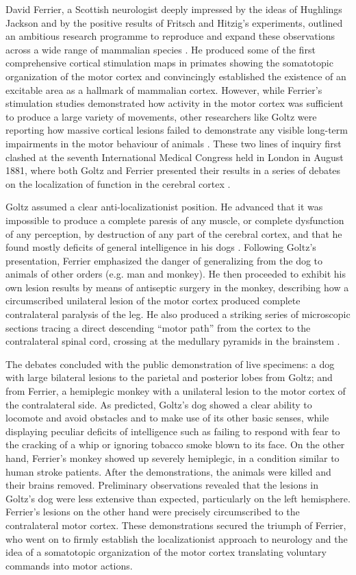 David Ferrier, a Scottish neurologist deeply impressed by the ideas of Hughlings Jackson and by the positive results of Fritsch and Hitzig's experiments, outlined an ambitious research programme to reproduce and expand these observations across a wide range of mammalian species \cite{Ferrier1873}. He produced some of the first comprehensive cortical stimulation maps in primates showing the somatotopic organization of the motor cortex and convincingly established the existence of an excitable area as a hallmark of mammalian cortex. However, while Ferrier's stimulation studies demonstrated how activity in the motor cortex was sufficient to produce a large variety of movements, other researchers like Goltz were reporting how massive cortical lesions failed to demonstrate any visible long-term impairments in the motor behaviour of animals \cite{Goltz1888}. These two lines of inquiry first clashed at the seventh International Medical Congress held in London in August 1881, where both Goltz and Ferrier presented their results in a series of debates on the localization of function in the cerebral cortex \cite{Tyler2000}.

Goltz assumed a clear anti-localizationist position. He advanced that it was impossible to produce a complete paresis of any muscle, or complete dysfunction of any perception, by destruction of any part of the cerebral cortex, and that he found mostly deficits of general intelligence in his dogs \cite{Tyler2000}. Following Goltz's presentation, Ferrier emphasized the danger of generalizing from the dog to animals of other orders (e.g. man and monkey). He then proceeded to exhibit his own lesion results by means of antiseptic surgery in the monkey, describing how a circumscribed unilateral lesion of the motor cortex produced complete contralateral paralysis of the leg. He also produced a striking series of microscopic sections tracing a direct descending ``motor path'' from the cortex to the contralateral spinal cord, crossing at the medullary pyramids in the brainstem \cite{Tyler2000}.

The debates concluded with the public demonstration of live specimens: a dog with large bilateral lesions to the parietal and posterior lobes from Goltz; and from Ferrier, a hemiplegic monkey with a unilateral lesion to the motor cortex of the contralateral side. As predicted, Goltz's dog showed a clear ability to locomote and avoid obstacles and to make use of its other basic senses, while displaying peculiar deficits of intelligence such as failing to respond with fear to the cracking of a whip or ignoring tobacco smoke blown to its face. On the other hand, Ferrier's monkey showed up severely hemiplegic, in a condition similar to human stroke patients. After the demonstrations, the animals were killed and their brains removed. Preliminary observations revealed that the lesions in Goltz's dog were less extensive than expected, particularly on the left hemisphere. Ferrier's lesions on the other hand were precisely circumscribed to the contralateral motor cortex. These demonstrations secured the triumph of Ferrier, who went on to firmly establish the localizationist approach to neurology and the idea of a somatotopic organization of the motor cortex translating voluntary commands into motor actions.

